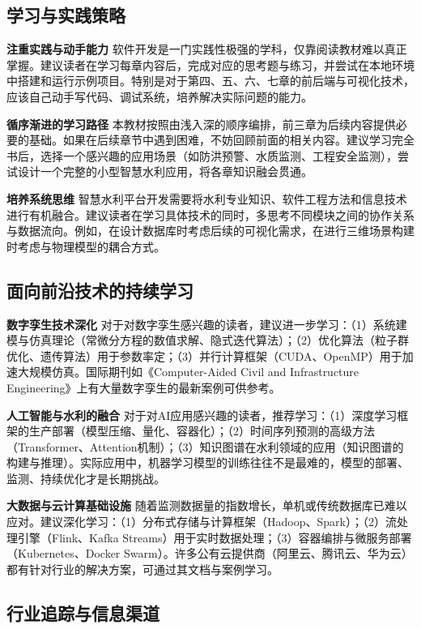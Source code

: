 \subsection*{学习与实践策略}

\textbf{注重实践与动手能力} 软件开发是一门实践性极强的学科，仅靠阅读教材难以真正掌握。建议读者在学习每章内容后，完成对应的思考题与练习，并尝试在本地环境中搭建和运行示例项目。特别是对于第四、五、六、七章的前后端与可视化技术，应该自己动手写代码、调试系统，培养解决实际问题的能力。

\textbf{循序渐进的学习路径} 本教材按照由浅入深的顺序编排，前三章为后续内容提供必要的基础。如果在后续章节中遇到困难，不妨回顾前面的相关内容。建议学习完全书后，选择一个感兴趣的应用场景（如防洪预警、水质监测、工程安全监测），尝试设计一个完整的小型智慧水利应用，将各章知识融会贯通。

\textbf{培养系统思维} 智慧水利平台开发需要将水利专业知识、软件工程方法和信息技术进行有机融合。建议读者在学习具体技术的同时，多思考不同模块之间的协作关系与数据流向。例如，在设计数据库时考虑后续的可视化需求，在进行三维场景构建时考虑与物理模型的耦合方式。

\subsection*{面向前沿技术的持续学习}

\textbf{数字孪生技术深化} 对于对数字孪生感兴趣的读者，建议进一步学习：（1）系统建模与仿真理论（常微分方程的数值求解、隐式迭代算法）；（2）优化算法（粒子群优化、遗传算法）用于参数率定；（3）并行计算框架（CUDA、OpenMP）用于加速大规模仿真。国际期刊如《Computer-Aided Civil and Infrastructure Engineering》上有大量数字孪生的最新案例可供参考。

\textbf{人工智能与水利的融合} 对于对AI应用感兴趣的读者，推荐学习：（1）深度学习框架的生产部署（模型压缩、量化、容器化）；（2）时间序列预测的高级方法（Transformer、Attention机制）；（3）知识图谱在水利领域的应用（知识图谱的构建与推理）。实际应用中，机器学习模型的训练往往不是最难的，模型的部署、监测、持续优化才是长期挑战。

\textbf{大数据与云计算基础设施} 随着监测数据量的指数增长，单机或传统数据库已难以应对。建议深化学习：（1）分布式存储与计算框架（Hadoop、Spark）；（2）流处理引擎（Flink、Kafka Streams）用于实时数据处理；（3）容器编排与微服务部署（Kubernetes、Docker Swarm）。许多公有云提供商（阿里云、腾讯云、华为云）都有针对行业的解决方案，可通过其文档与案例学习。

\subsection*{行业追踪与信息渠道}

